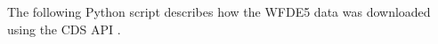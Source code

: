 \label{sec:download_wfde5}

The following Python script describes how the WFDE5 data was downloaded using the CDS API \parencite{cucchi_2022}. 

